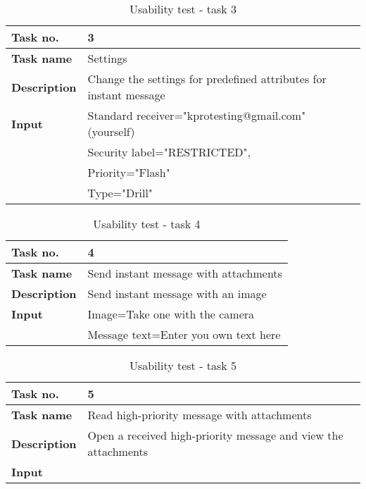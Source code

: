 \begin{table}[h!]
\begin{center}
\begin{tabular}{>{\bfseries}l|l}\hline
Task no.&3\\ \hline
Task name&Settings\\ \hline
Description&Change the settings for predefined attributes for instant message\\ \hline
Input&Standard receiver="kprotesting@gmail.com" (yourself)\\
& Security label="RESTRICTED",\\
&Priority="Flash"\\
& Type="Drill"\\ \hline
\end{tabular}
\end{center}
\caption{Usability test - task 3} \label{tab:usabilitytask3}
\end{table}

\begin{table}[h!]
\begin{center}
\begin{tabular}{>{\bfseries}l|l}\hline
Task no.&4\\ \hline
Task name&Send instant message with attachments\\ \hline
Description&Send instant message with an image\\ \hline
Input &Image=Take one with the camera\\
&Message text=Enter you own text here\\ \hline
\end{tabular}
\end{center}
\caption{Usability test - task 4} \label{tab:usabilitytask4}
\end{table}

\begin{table}[h!]
\begin{center}
\begin{tabular}{>{\bfseries}l|l}\hline
Task no.&5\\ \hline
Task name&Read high-priority message with attachments\\ \hline
Description&Open a received high-priority message and view the attachments\\ \hline
Input&\\ \hline
\end{tabular}
\end{center}
\caption{Usability test - task 5} \label{tab:usabilitytask5}
\end{table}


